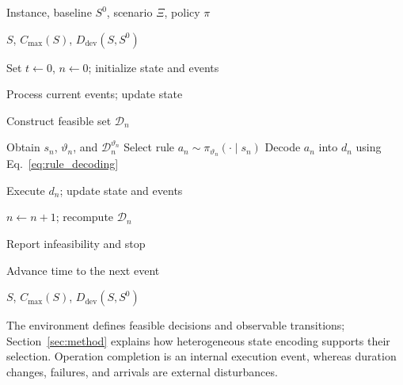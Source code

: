 \begin{algorithm}[t]
\caption{Event-driven reactive scheduling}
\label{alg:reactive_simulation}
\small
\begin{algorithmic}[1]

\Require Instance, baseline $S^0$, scenario $\Xi$, policy $\pi$

\Ensure $S$, $C_{\max}(S)$, $D_{\mathrm{dev}}(S,S^0)$

\State Set $t\gets0$, $n\gets0$; initialize state and events


 \State Process current events; update state

 \State Construct feasible set $\mathcal D_n$


  \State Obtain $s_n$, $\vartheta_n$, and $\mathcal D_n^{\vartheta_n}$
  \State Select rule $a_n\sim\pi_{\vartheta_n}(\cdot\mid s_n)$
  \State Decode $a_n$ into $d_n$ using Eq.~\eqref{eq:rule_decoding}

  \State Execute $d_n$; update state and events

  \State $n\gets n+1$; recompute $\mathcal D_n$

 \EndWhile



   \State Report infeasibility and stop

  \EndIf

  \State Advance time to the next event

 \EndIf

\EndWhile
\State \Return $S$, $C_{\max}(S)$, $D_{\mathrm{dev}}(S,S^0)$
\end{algorithmic}
\end{algorithm}

The environment defines feasible decisions and observable transitions; Section~\ref{sec:method} explains how heterogeneous state encoding supports their selection. Operation completion is an internal execution event, whereas duration changes, failures, and arrivals are external disturbances.
